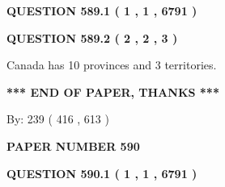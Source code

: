 \documentclass[12pt]{article}
\begin{document}
   
 \vspace{0.2in}
 
 
 
 
   
   
  
\vspace{0.2in}
  
{\textbf{\Large{QUESTION
589.1 
 ( 1 , 1 , 6791 )
}}}
  
  
  
\vspace{0.2in}
  
{\textbf{\Large{QUESTION
589.2 
 ( 2 , 2 , 3 )
}}}
  
  
 
 
\noindent{}
 
 
Canada has 10  provinces and 3 territories.
 
 
 
 
   
   
 \vspace{0.2in}
 
   
   
   
   
\vspace{1.0in} 
{\textbf{\large{ *** END OF PAPER, THANKS *** }}} 
   
   
\hspace{1.0in} By: 
 239 ( 416 ,  613 )
   
   
   
   
\newpage 
\setcounter{page}{ 
   590001 } 
   
   
   
   
 {\textbf{ \Large{ PAPER NUMBER  590  }}}
   
   
\vspace{0.2in}
   
   
   
   
   
   
 \vspace{0.2in}
 
 
 
 
   
   
  
\vspace{0.2in}
  
{\textbf{\Large{QUESTION
590.1 
 ( 1 , 1 , 6791 )
}}}
  
  
  
\end{document}
